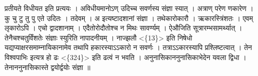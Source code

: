 प्रतीयते विधीयत इति प्रत्ययः । अविधीयमानोऽण् उदिच्च सवर्णस्य संज्ञा
स्यात् । अत्राण् परेण णकारेण । कु चु टु तु पु एते उदितः । तदेवम् । अ
इत्यष्टादशानां संज्ञा । तथेकारोकारौ । ऋकारस्त्रिंशतः । एवम् लृकारोऽपि ।
एचो द्वादशानाम् । एदैतोरोदौतोश्च न मिथः सावर्ण्यम् । ऐऔजिति
सूत्रारम्भसामर्थ्यात् । तेनैचश्चतुर्विंशतेः संज्ञाः स्युरिति नापादनीयम्
। नाज्झलौ \textless{}\{13\}\textgreater{} इति निषेधो
यद्यप्याक्षरसमाम्नायिकानामेव तथापि हकारस्याऽऽकारो न सवर्णः ।
तत्राऽऽकारस्यापि प्रश्लिष्टत्वात् । तेन विश्वपाभिः इत्यत्र हो ढः
\textless{}\{324\}\textgreater{} इति ढत्वं न भवति ।
अनुनासिकाननुनासिकाभेदेन यवला द्विधा । तेनाननुनासिकास्ते द्वयोर्द्वयोः
संज्ञा ॥
